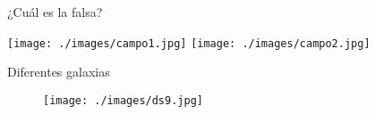 \documentclass[10pt]{beamer}
\begin{document}
\begin{frame}
¿Cu\'al es la falsa?
\begin{center}
 \texttt{[image: ./images/campo1.jpg]}
 \texttt{[image: ./images/campo2.jpg]}
\end{center}
\end{frame}
\begin{frame}
Diferentes galaxias
\begin{figure}
 \centering
 \texttt{[image: ./images/ds9.jpg]}
\end{figure}
\end{frame}
\end{document}

